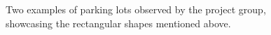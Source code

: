 \begin{figure}[H]
  \centering
  \begin{subfigure}[b]{0.55\textwidth}
  \end{subfigure}
  \quad
  \begin{subfigure}[b]{0.395\textwidth}
  \end{subfigure}
  \caption{Two examples of parking lots observed by the project group, showcasing the rectangular shapes mentioned above.}
  \label{fig:parkings}
\end{figure}
